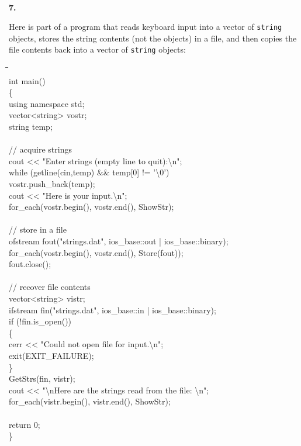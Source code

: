 \documentclass[10 pt]{amsart}
\newlength{\cwidth}
\newenvironment{cpart}[2][\cwidth]
	{%
		\\ %
		\textbf{#2. }%
		\begin{minipage}[t]{#1}%
		\setlength{\parindent}{0pt}%
		\setlength{\parskip}{2ex}%
	}
	{%
		\end{minipage}%
	}
\newcommand{\ttt}[1]{\texttt{#1}}
\newcommand{\tbs}{\textbackslash}
\begin{document}
	\begin{cpart}{7}
		Here is part of a program that reads keyboard input into a
		vector of \ttt{string} objects, stores the string contents
		(not the objects) in a file, and then copies the file 
		contents back into a vector of \ttt{string} objects: 
		{\ttfamily
			\begin{tabbing}
				\phantom{\qquad}\=\phantom{\qquad}\=\phantom{\qquad}\= \\
				int main() \\
				\{ 
				\+ \\
					using namespace std; \\
					vector<string> vostr; \\
					string temp; \\
					\\
				\< // acquire strings \\
					cout << "Enter strings (empty line to quit):\tbs n"; \\
					while (getline(cin,temp) \&\& temp[0] != '\tbs 0') \\
					\> 	vostr.push\_back(temp); \\
					cout << "Here is your input.\tbs n"; \\
					for\_each(vostr.begin(), vostr.end(), ShowStr); \\
					\\
				\< // store in a file \\
					ofstream fout("strings.dat", ios\_base::out | 
						ios\_base::binary); \\
					for\_each(vostr.begin(), vostr.end(), Store(fout)); \\
					fout.close(); \\
					\\
				\< // recover file contents \\
					vector<string> vistr; \\
					ifstream fin("strings.dat", ios\_base::in |
						ios\_base::binary); \\
					if (!fin.is\_open()) \\
					\{ \\
					\> 	cerr << "Could not open file for input.\tbs n"; \\
					\> 	exit(EXIT\_FAILURE); \\
					\} \\
					GetStrs(fin, vistr); \\
					cout << "\tbs nHere are the strings read from the file:
						\tbs n"; \\
					for\_each(vistr.begin(), vistr.end(), ShowStr); \\
					\\
					return 0; \\
				\< \}
			\end{tabbing}
		}
	\end{cpart}
\end{document}
